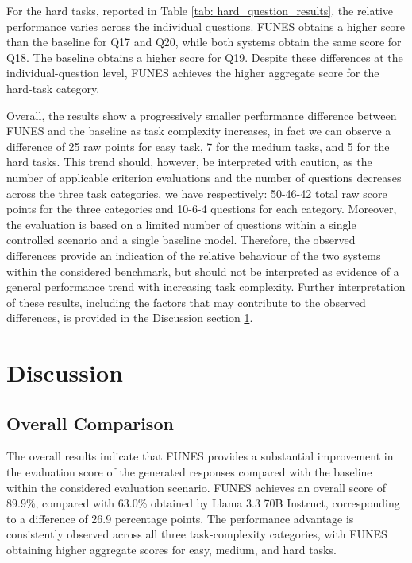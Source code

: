For the hard tasks, reported in Table \ref{tab: hard_question_results}, the relative performance varies across the individual questions. FUNES obtains a higher score than the baseline for Q17 and Q20, while both systems obtain the same score for Q18. The baseline obtains a higher score for Q19. Despite these differences at the individual-question level, FUNES achieves the higher aggregate score for the hard-task category.

Overall, the results show a progressively smaller performance difference between FUNES and the baseline as task complexity increases, in fact we can observe a difference of 25 raw points for easy task, 7 for the medium tasks, and 5 for the hard tasks. This trend should, however, be interpreted with caution, as the number of applicable criterion evaluations and the number of questions decreases across the three task categories, we have respectively: 50-46-42 total raw score points for the three categories and 10-6-4 questions for each category. Moreover, the evaluation is based on a limited number of questions within a single controlled scenario and a single baseline model. Therefore, the observed differences provide an indication of the relative behaviour of the two systems within the considered benchmark, but should not be interpreted as evidence of a general performance trend with increasing task complexity. Further interpretation of these results, including the factors that may contribute to the observed differences, is provided in the Discussion section \ref{sec:evaluation discussion}.



\section{Discussion}
\label{sec:evaluation discussion}


\subsection{Overall Comparison}

The overall results indicate that FUNES provides a substantial improvement in the evaluation score of the generated responses compared with the baseline within the considered evaluation scenario. FUNES achieves an overall score of 89.9\%, compared with 63.0\% obtained by Llama 3.3 70B Instruct, corresponding to a difference of 26.9 percentage points. The performance advantage is consistently observed across all three task-complexity categories, with FUNES obtaining higher aggregate scores for easy, medium, and hard tasks.


